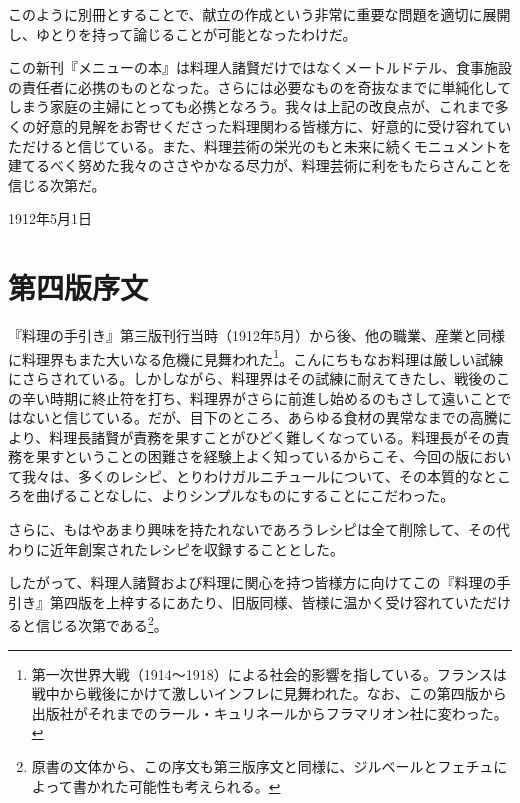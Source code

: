 このように別冊とすることで、献立の作成という非常に重要な問題を適切に展開し、ゆとりを持って論じることが可能となったわけだ。

この新刊『メニューの本』は料理人諸賢だけではなくメートルドテル、食事施設の責任者に必携のものとなった。さらには必要なものを奇抜なまでに単純化してしまう家庭の主婦にとっても必携となろう。我々は上記の改良点が、これまで多くの好意的見解をお寄せくださった料理関わる皆様方に、好意的に受け容れていただけると信じている。また、料理芸術の栄光のもと未来に続くモニュメントを建てるべく努めた我々のささやかなる尽力が、料理芸術に利をもたらさんことを信じる次第だ。

\begin{flushright}
1912年5月1日
\end{flushright}

\hypertarget{introduction-quatrieme-edition}{%
\section{第四版序文}\label{introduction-quatrieme-edition}}

\vspace*{1\zw}

『料理の手引き』第三版刊行当時（1912年5月）から後、他の職業、産業と同様に料理界もまた大いなる危機に見舞われた\footnote{第一次世界大戦（1914〜1918）による社会的影響を指している。フランスは戦中から戦後にかけて激しいインフレに見舞われた。なお、この第四版から出版社がそれまでのラール・キュリネールからフラマリオン社に変わった。}。こんにちもなお料理は厳しい試練にさらされている。しかしながら、料理界はその試練に耐えてきたし、戦後のこの辛い時期に終止符を打ち、料理界がさらに前進し始めるのもさして遠いことではないと信じている。だが、目下のところ、あらゆる食材の異常なまでの高騰により、料理長諸賢が責務を果すことがひどく難しくなっている。料理長がその責務を果すということの困難さを経験上よく知っているからこそ、今回の版において我々は、多くのレシピ、とりわけガルニチュールについて、その本質的なところを曲げることなしに、よりシンプルなものにすることにこだわった。

さらに、もはやあまり興味を持たれないであろうレシピは全て削除して、その代わりに近年創案されたレシピを収録することとした。

したがって、料理人諸賢および料理に関心を持つ皆様方に向けてこの『料理の手引き』第四版を上梓するにあたり、旧版同様、皆様に温かく受け容れていただけると信じる次第である\footnote{原書の文体から、この序文も第三版序文と同様に、ジルベールとフェチュによって書かれた可能性も考えられる。}。

